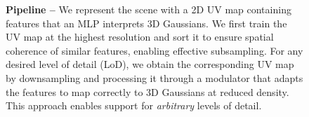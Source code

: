 \begin{figure}
  \centering
  \clogpipelinefig
  \caption{
    \textbf{Pipeline --}
    We represent the scene with a 2D UV map containing features that an MLP
    interprets 3D Gaussians.
    We first train the UV map at the highest resolution and sort it to ensure
    spatial coherence of similar features, enabling effective subsampling.
    For any desired level of detail (LoD), we obtain the corresponding UV map
    by downsampling and processing it through a modulator that adapts the
    features to map correctly to 3D Gaussians at reduced density.
    This approach enables support for \emph{arbitrary} levels of detail.
  }
  \label{fig:clog-pipeline}
\end{figure}